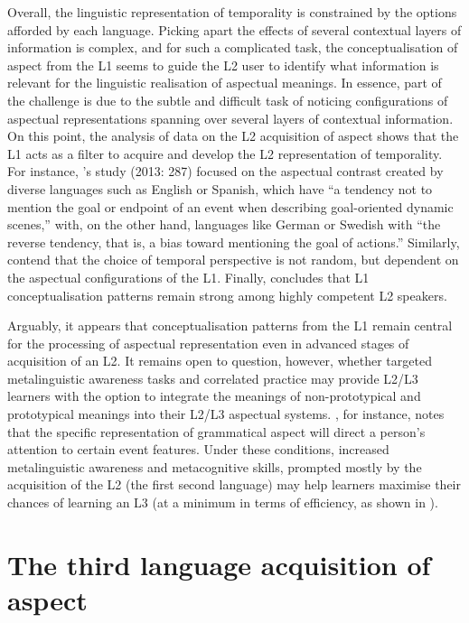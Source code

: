 \documentclass[output=paper,modfonts,nonflat,newtxmath]{langsci/langscibook}
\begin{document}
Overall, the linguistic representation of temporality is constrained by the options afforded by each language. Picking apart the effects of several contextual layers of information is complex, and for such a complicated task, the conceptualisation of aspect from the L1 seems to guide the L2 user to identify what information is relevant for the linguistic realisation of aspectual meanings. In essence, part of the challenge is due to the subtle and difficult task of noticing configurations of aspectual representations spanning over several layers of contextual information. On this point, the analysis of data on the L2 acquisition of aspect shows that the L1 acts as a filter to acquire and develop the L2 representation of temporality. For instance, \citeauthor{AthanasopoulosBylund2013}'s study (2013: 287) focused on the aspectual contrast created by diverse languages such as English or Spanish, which have “a tendency not to mention the goal or endpoint of an event when describing goal-oriented dynamic scenes,” with, on the other hand, languages like German or Swedish with “the reverse tendency, that is, a bias toward mentioning the goal of actions.” Similarly, \citet{SchmiedtovaEtAl2011} contend that the choice of temporal perspective is not random, but dependent on the aspectual configurations of the L1. Finally, \citet[116]{Bylund2011} concludes that L1 conceptualisation patterns remain strong among highly competent L2 speakers.

Arguably, it appears that conceptualisation patterns from the L1 remain central for the processing of aspectual representation even in advanced stages of acquisition of an L2. It remains open to question, however, whether targeted metalinguistic awareness tasks and correlated practice may provide L2/L3 learners with the option to integrate the meanings of non-prototypical and prototypical meanings into their L2/L3 aspectual systems. \citet{Bylund2011}, for instance, notes that the specific representation of grammatical aspect will direct a person’s attention to certain event features. Under these conditions, increased metalinguistic awareness and metacognitive skills, prompted mostly by the acquisition of the L2 (the first second language) may help learners maximise their chances of learning an L3 (at a minimum in terms of efficiency, as shown in \citealt{NayakEtAl1990}).

\section{{The} {third} {language} {acquisition} {of} {aspect} }%
\label{sec:salaberry:3}
\end{document}
